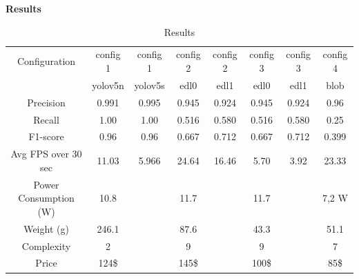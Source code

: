\textbf{Results}
\begin{table}[ht]
\centering
\begin{tabular}
{ |c|c|c|c|c|c|c|c| } 
\hline
Configuration & config 1 & config 1 & config 2 & config 2 & config 3 & config 3 & config 4\\
              & yolov5n & yolov5s  &  edl0    &  edl1     & edl0    & edl1     & blob\\
\hline
Precision & 0.991 & 0.995 & 0.945 & 0.924 & 0.945 &  0.924 & 0.96\\
\hline
Recall & 1.00 & 1.00 & 0.516 & 0.580 & 0.516 & 0.580 & 0.25\\
\hline
F1-score & 0.96 & 0.96 & 0.667 & 0.712 & 0.667 & 0.712 & 0.399\\
\hline
Avg FPS over 30 sec & 11.03 & 5.966 & 24.64 & 16.46 & 5.70 & 3.92 & 23.33\\
\hline
Power Consumption (W) & 10.8 &  & 11.7 & & 11.7 & & 7,2 W \\
\hline
Weight (g) & 246.1 &  & 87.6 & & 43.3 & & 51.1 \\
\hline
Complexity & 2 &  & 9 & & 9 & & 7 \\
\hline
Price & 124\$ &  & 145\$ & & 100\$ & & 85\$ \\
\hline
\end{tabular}
\caption{Results}
\label{tab:målinger}
\end{table}

\newpage


